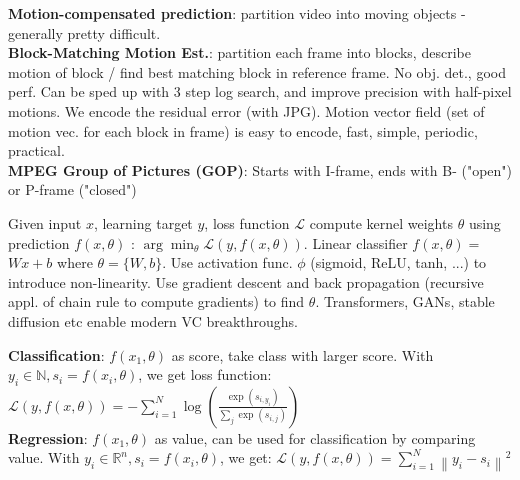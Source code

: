 \textbf{Motion-compensated prediction}: partition video into moving objects - generally pretty difficult. \\
\textbf{Block-Matching Motion Est.}: partition each frame into blocks, describe motion of block / find best matching block in reference frame. No obj. det., good perf. Can be sped up with 3 step log search, and improve precision with half-pixel motions. We encode the residual error (with JPG). Motion vector field (set of motion vec. for each block in frame) is easy to encode, fast, simple, periodic, practical.\\

\textbf{MPEG Group of Pictures (GOP)}: Starts with I-frame, ends with B- ("open") or P-frame ("closed")



Given input $x$, learning target $y$, loss function $\mathcal{L}$ compute kernel weights $\theta$ using prediction $f(x, \theta)$ : $\arg \min _\theta \mathcal{L}(y, f(x, \theta))$. Linear classifier $f(x, \theta)=$ $W x+b$ where $\theta=\{W, b\}$. Use activation func. $\phi$ (sigmoid, ReLU, tanh, ...) to introduce non-linearity. Use gradient descent and back propagation (recursive appl. of chain rule to compute gradients) to find $\theta$. Transformers, GANs, stable diffusion etc enable modern VC breakthroughs.

\textbf{Classification}: $f\left(x_1, \theta\right)$ as score, take class with larger score. With $y_i \in \mathbb{N}, s_i=f\left(x_i, \theta\right)$, we get loss function: $\mathcal{L}(y, f(x, \theta))=-\sum_{i=1}^N \log \left(\frac{\exp \left(s_{i, y_i}\right)}{\sum_j \exp \left(s_{i, j}\right)}\right)$\\
\textbf{Regression}: $f\left(x_1, \theta\right)$ as value, can be used for classification by comparing value. With $y_i \in \mathbb{R}^n, s_i=f\left(x_i, \theta\right)$, we get: $\mathcal{L}(y, f(x, \theta))=\sum_{i=1}^N\left\|y_i-s_i\right\|^2$



